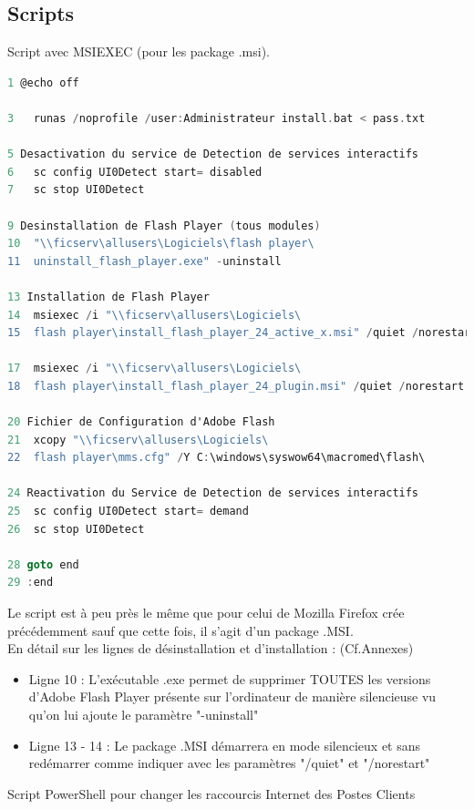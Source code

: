\documentclass[11pt,a4paper,oneside]{article}
\begin{document}
\subsection{Scripts}
Script avec MSIEXEC (pour les package .msi).
\begin{lstlisting}[language=C]
1 @echo off

3	runas /noprofile /user:Administrateur install.bat < pass.txt

5 Desactivation du service de Detection de services interactifs
6	sc config UI0Detect start= disabled
7	sc stop UI0Detect

9 Desinstallation de Flash Player (tous modules)
10	"\\ficserv\allusers\Logiciels\flash player\
11	uninstall_flash_player.exe" -uninstall

13 Installation de Flash Player
14	msiexec /i "\\ficserv\allusers\Logiciels\
15	flash player\install_flash_player_24_active_x.msi" /quiet /norestart
	
17	msiexec /i "\\ficserv\allusers\Logiciels\
18	flash player\install_flash_player_24_plugin.msi" /quiet /norestart

20 Fichier de Configuration d'Adobe Flash 
21	xcopy "\\ficserv\allusers\Logiciels\
22	flash player\mms.cfg" /Y C:\windows\syswow64\macromed\flash\ 

24 Reactivation du Service de Detection de services interactifs
25	sc config UI0Detect start= demand
26	sc stop UI0Detect

28 goto end
29 :end
\end{lstlisting}

Le script est à peu près le même que pour celui de Mozilla Firefox crée précédemment sauf que cette fois, il s'agit d'un package .MSI.\\
En détail sur les lignes de désinstallation et d'installation : (Cf.Annexes) \\
\begin{itemize}
\item Ligne 10 : L'exécutable .exe permet de supprimer TOUTES les versions d'Adobe Flash Player présente sur 			l'ordinateur de manière silencieuse vu qu'on lui ajoute le paramètre "-uninstall" \\

\item Ligne 13 - 14 : Le package .MSI démarrera en mode silencieux et sans redémarrer comme indiquer avec les paramètres "/quiet" et "/norestart"
\end{itemize}
\newpage
Script PowerShell pour changer les raccourcis Internet des Postes Clients
\end{document}
